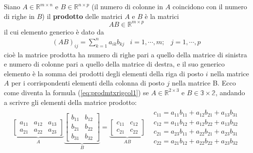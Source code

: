 \documentclass{book}
\theoremstyle{definition}
\theoremstyle{plain}
\begin{document}
Siano $A\in \mathds{R}^{m\times n}$ e $B\in \mathds{R}^{n\times p}$ (il numero di
colonne in $A$ coincidono con il numero di righe in $B$) il \textbf{prodotto} delle
matrici $A$ e $B$ è la matrici
\begin{equation*}
  AB\in \mathds{R}^{m\times p}
\end{equation*}
il cui elemento generico è dato da
\begin{eqnarray}
  \label{eq:prodmtxrigcol1}
  (AB)_{ij}=\sum_{k=1}^na_{ik}b_{kj} & i=1,\cdots,m; & j = 1,\cdots,p
\end{eqnarray}
cioè la matrice prodotta ha numero di righe pari a quello della matrice di sinistra
e numero di colonne pari a quello della matrice di destra, e il suo generico elemento
è la somma dei prodotti degli elementi della riga di posto $i$ nella matrice $A$ per
i corrispondenti elementi della colonna di posto $j$ nella matrice B.
Ecco come diventa la formula (\ref{eq:prodmtxrigcol1}) se $A\in \mathds{R}^{2\times3}$
e $B\in \mathds{3\times 2}$, andando a scrivre gli elementi della matrice prodotto:
\begin{eqnarray}
  \label{eq:prodmtxrigcol2}
  \underbrace{\begin{bmatrix}
    a_{11} & a_{12} & a_{13}\\
    a_{21} & a_{22} & a_{23}
  \end{bmatrix}}_{A}
  \underbrace{\begin{bmatrix}
    b_{11} & b_{12} \\
    b_{21} & b_{22} \\
    b_{31} & b_{32}
  \end{bmatrix}}_{B}=
  \underbrace{\begin{bmatrix}
    c_{11} & c_{12}\\
    c_{21} & c_{22} 
  \end{bmatrix}}_{AB} &
                  \begin{matrix}
                    c_{11}=a_{11}b_{11} + a_{12}b_{21} + a_{13} b_{31}\\
                    c_{12}=a_{11}b_{12} + a_{12}b_{22} + a_{13} b_{32}\\
                    c_{21}=a_{23}b_{11} + a_{22}b_{21} + a_{23} b_{31}\\
                    c_{22}=a_{21}b_{12} + a_{22}b_{22} + a_{23} b_{32}
                  \end{matrix}
\end{eqnarray}
\end{document}

